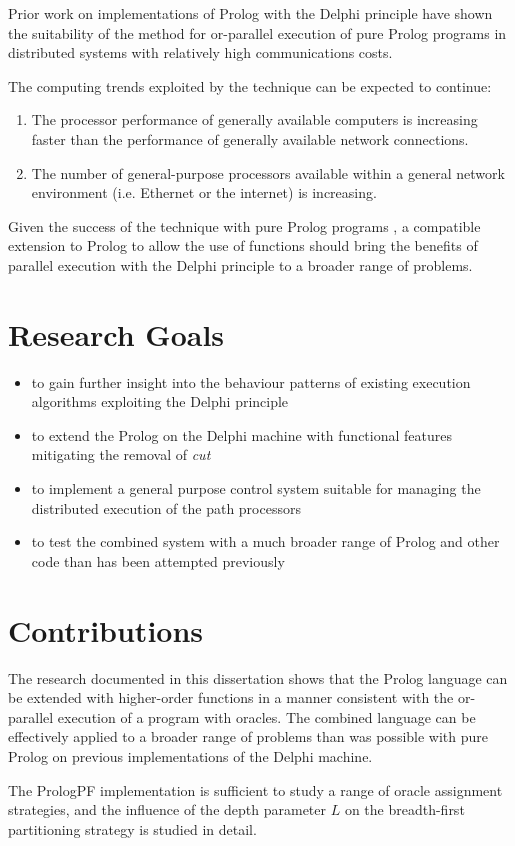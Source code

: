 Prior work on implementations of Prolog with the Delphi principle
\cite{Kle91, Sar95} have shown the suitability of the method for
or-parallel execution of pure Prolog programs in distributed systems
with relatively high communications costs.

The computing trends exploited by the technique can be expected to
continue:
\begin{enumerate}
\item{The processor performance of generally available computers
  is increasing faster than the performance of generally available
  network connections.}
\item{The number of general-purpose processors available within
  a general network environment (i.e. Ethernet or the internet)
  is increasing.}
\end{enumerate}

Given the success of the technique with pure Prolog programs
\cite{Sar95}, a compatible extension to Prolog to allow the use
of functions should bring the benefits of parallel execution
with the Delphi principle to
a broader range of problems.

\section{Research Goals} %

\begin{itemize}
\item{to gain further insight into the behaviour patterns of
  existing execution algorithms exploiting the Delphi principle}
\item{to extend the Prolog on the Delphi machine with functional features
  mitigating the removal of \textit{cut}}
\item{to implement a general purpose control system suitable for
  managing the distributed execution of the path processors}
\item{to test the combined system with a much broader range of
  Prolog and other code than has been attempted previously}
\end{itemize}

\section{Contributions} %

The research documented in this dissertation shows that the Prolog
language can be extended with higher-order functions in a manner
consistent with the or-parallel execution of a program with oracles.
The combined language can be effectively
applied to a broader range of problems than was possible with pure
Prolog on previous implementations of the Delphi machine.

The PrologPF 
implementation is sufficient to study a range of oracle assignment
strategies, and the influence of the depth parameter $L$ on the
breadth-first partitioning strategy is studied in detail.

